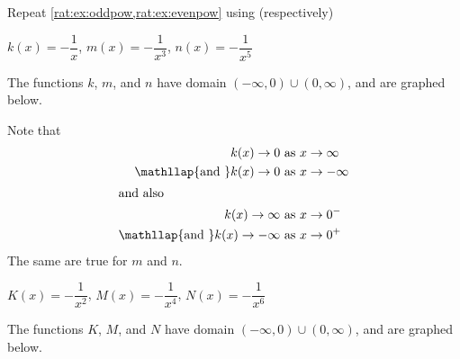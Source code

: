 \begin{doyouunderstand}
\begin{problem}
Repeat \cref{rat:ex:oddpow,rat:ex:evenpow} using (respectively)
\begin{subproblem}
    $k(x)=-\dfrac{1}{x}$, $ m(x)=-\dfrac{1}{x^3}$, $ n(x)=-\dfrac{1}{x^5}$
    \begin{shortsolution}
     The functions $k$, $m$, and $n$ have domain $(-\infty,0)\cup (0,\infty)$, and 
     are graphed below.


    Note that
    \begin{align*}
        k(x)\rightarrow 0                           & \text{ as } x\rightarrow\infty\\
        \mathllap{\text{and }}    k(x)\rightarrow 0 &\text{ as } x\rightarrow-\infty\\
        \intertext{and also}
        k(x)\rightarrow \infty     & \text{ as } x\rightarrow 0^-\\
        \mathllap{\text{and }}   k(x)\rightarrow -\infty &\text{ as } x\rightarrow 0^+
    \end{align*}
    The same are true for $m$ and $n$.
    \end{shortsolution}
\end{subproblem}
\begin{subproblem}
    $ K(x)=-\dfrac{1}{x^2}$, $ M(x)=-\dfrac{1}{x^4}$, $ N(x)=-\dfrac{1}{x^6}$
    \begin{shortsolution}
        The functions $K$, $M$, and $N$ have domain $(-\infty,0)\cup (0,\infty)$, and 
        are graphed below.


\end{shortsolution}
\end{subproblem}
\end{problem}
\end{doyouunderstand}
